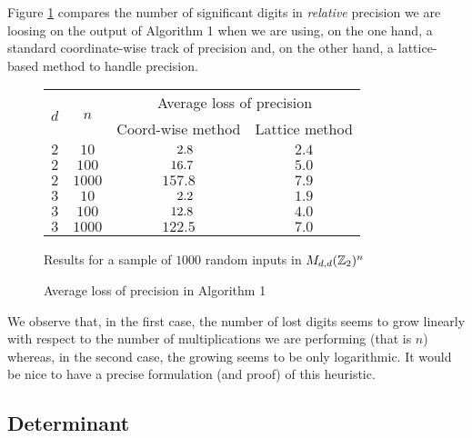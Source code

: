 \documentclass{sig-alternate}
\begin{document}
\medskip

\noindent
Figure \ref{fig:mulmatrix} compares the number of significant digits in 
\emph{relative} precision we are loosing on the output of Algorithm 1 
when we are using, on the one hand, a standard coordinate-wise track of 
precision and, on the other hand, a lattice-based method to handle 
precision.
%
\begin{figure}
\begin{center}
\renewcommand{\arraystretch}{1.2}
\begin{tabular}{|c|c|c|c|}
\hline
\multirow{2}{*}{\hspace{0.2cm}$d$\hspace{0.2cm}} & 
\multirow{2}{*}{\hspace{0.2cm}$n$\hspace{0.2cm}} & 
\multicolumn{2}{|c|}{Average loss of precision} \\
\cline{3-4}
& & Coord-wise method & Lattice method \\
\hline 
$2$ & $10$ & $\hphantom{00}2.8$ & $2.4$ \\
$2$ & $100$ & $\hphantom{0}16.7$ & $5.0$ \\
$2$ & $1000$ & $157.8$ & $7.9$ \\
\hline
$3$ & $10$ & $\hphantom{00}2.2$ & $1.9$ \\
$3$ & $100$ & $\hphantom{0}12.8$ & $4.0$ \\
$3$ & $1000$ & $122.5$ & $7.0$ \\
\hline
\end{tabular}

\smallskip

{\small
Results for a sample of $1000$ random inputs in $M_{d,d}(\mathbb Z_2)^n$}
\end{center}
\renewcommand{\arraystretch}{1}

\vspace{-0.3cm}

\caption{Average loss of precision in Algorithm 1}
\label{fig:mulmatrix}
\end{figure}
%
We observe that, in the first case, the number of lost digits seems to 
grow linearly with respect to the number of multiplications we are 
performing (that is $n$) whereas, in the second case, the growing seems 
to be only logarithmic. It would be nice to have a precise formulation 
(and proof) of this heuristic.

\subsection{Determinant}
\end{document}
